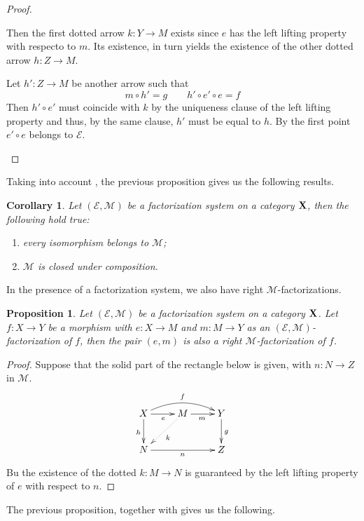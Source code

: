 \documentclass[a4paper]{article}
\def\X{\textbf {\textup{X}}}
\newtheorem{proposition}[theorem]{Proposition}
\newtheorem{corollary}[theorem]{Corollary}
\theoremstyle{definition}
\begin{document}
\begin{proof}
\begin{enumerate}
		Then the first dotted arrow $k\colon Y\to M$ exists since $e$ has the left lifting property with respecto to $m$. Its existence, in turn yields the existence of the other dotted arrow $h\colon Z\to M$. 
		
		Let $h'\colon Z\to M$ be another arrow such that 
		\[m\circ h'=g \qquad h'\circ e'\circ e=f\]
		Then $h'\circ e'$ must coincide with $k$ by the uniqueness clause of the left lifting property and thus, by the same clause, $h'$ must be equal to $h$. By the first point $e'\circ e$ belongs to $\mathcal{E}$. \qedhere 
	\end{enumerate}
\end{proof}

Taking into account , the previous proposition gives us the following results.

\begin{corollary}\label{cor:m}Let $(\mathcal{E}, \mathcal{M})$ be a factorization system on a category $\X$, then the following hold true:
	\begin{enumerate}
		\item every isomorphism belongs to $\mathcal{M}$;
		\item $\mathcal{M}$ is closed under composition.
	\end{enumerate}
\end{corollary}

In the presence of a factorization system, we also have right $\mathcal{M}$-factorizations.

\begin{proposition}\label{prop:rfact}
	Let $(\mathcal{E}, \mathcal{M})$ be a factorization system on a category $\X$. Let $f\colon X\to Y$ be a morphism with $e\colon X\to M$ and $m\colon M\to Y$ as an $(\mathcal{E}, \mathcal{M})$-factorization of $f$, then the pair $(e, m)$ is also a right $\mathcal{M}$-factorization of $f$.
\end{proposition}
\begin{proof}
	Suppose that the solid part of the rectangle below is given, with $n\colon N\to Z$ in $\mathcal{M}$. 
	\[\xymatrix{X \ar[d]_{h} \ar@/^.4cm/[rr]^{f} \ar[r]_{e}& M \ar@{.>}[dl]^{k} \ar[r]_{m} & Y \ar[d]^{g}\\N \ar[rr]_{n}&& Z}\]
	Bu the existence of the dotted $k\colon M\to N$ is guaranteed by the left lifting property of $e$ with respect to $n$.
\end{proof}

The previous proposition, together with  gives us the following.
\end{document}
